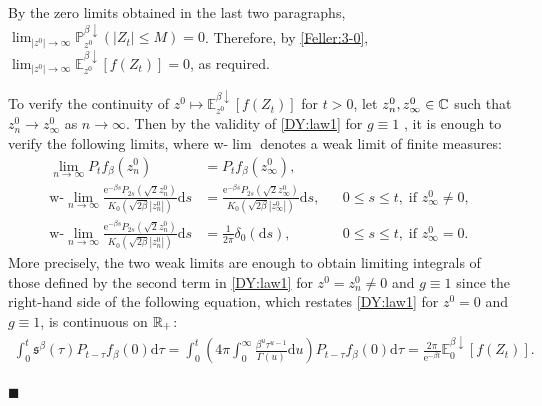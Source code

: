 \documentclass[12pt, twoside]{article}
\numberwithin{figure}{section}
\newcommand{\e}{{\mathrm e}}
\newcommand{\1}{\mathds 1}
\newcommand{\da}{{\downarrow}}
\renewcommand{\P}{{\mathbb P}}
\newcommand{\E}{{\mathbb E}}
\renewcommand{\d}{{\mathrm d}}
\newcommand{\R}{{\Bbb R}}
\newcommand{\2}{{\mathbf 1}}
\newcommand{\s}{{\mathfrak s}}
\renewenvironment{proof}[1][\proofname]{\noindent {\bfseries #1.}\;}{\hfill\ensuremath{\blacksquare}\\}
\newcommand{\two}{{\sqrt{2}}}
\begin{document}
\begin{proof}[Proof of Theorem~\ref{thm:formulas}]
By the zero limits obtained in the last two paragraphs, $\lim_{|z^0|\to\infty}\P^{\beta\da}_{z^0}(|Z_t|\leq M)=0$. Therefore,  by \eqref{Feller:3-0},
$\lim_{|z^0|\to\infty}\E^{\beta\da }_{z^0}[f(Z_t)]=0$, as required. \smallskip 

 To verify the continuity of $z^0\mapsto \E^{\beta\da}_{z^0}[f(Z_t)]$ for $t>0$, let $z^0_n,z^0_\infty\in \Bbb C$ such that $z^0_n\to z^0_\infty$ as $n\to\infty$. Then
by the validity of  \eqref{DY:law1} for $g\equiv 1$  \cite[Theorem~2.10]{C:BES}, it is enough to verify the following limits, where w-$\lim$ denotes a weak limit of finite measures:
\begin{align}
\lim_{n\to\infty}P_tf_\beta(z^0_n)&=P_tf_\beta(z^0_\infty),\label{DYlaw:lim1}\\
\mbox{w-}\lim_{n\to\infty}\frac{\e^{-\beta s}P_{2s}(\two z^0_n)}{K_0(\sqrt{2\beta}|z^0_n|)}\d s&= \frac{\e^{-\beta s}P_{2s}(\two z^0_\infty)}{K_0(\sqrt{2\beta}|z^0_\infty|)}\d s,&& 0\leq s\leq t,\;\mbox{if }z^0_\infty\neq 0 ,\label{DYlaw:lim2}\\
\mbox{w-}\lim_{n\to\infty}\frac{\e^{-\beta s}P_{2s}(\two z^0_n)}{K_0(\sqrt{2\beta}|z^0_n|)}\d s&=\frac{1}{2\pi}\delta_0(\d s),&& 0\leq s\leq t,\;\mbox{if }z^0_\infty= 0 .\label{DYlaw:lim3}
\end{align}
More precisely, the two weak limits are enough to obtain limiting integrals of those defined by the second term in \eqref{DY:law1} for $z^0=z^0_n\neq 0$ and $g\equiv 1$ since the right-hand side of the following equation, which restates \eqref{DY:law1} for $z^0=0$ and $g\equiv 1$, is continuous on $\R_+$:
\begin{align}\label{continuity_t=0}
\int_0^{t} \s^\beta(\tau)P_{t-\tau}f_{\beta}(0)\d \tau=\int_0^{t} \left(4\pi\int_0^\infty \frac{\beta^u\tau^{u-1}}{\Gamma(u)}\d u \right) P_{t-\tau}f_{\beta}(0)\d \tau=\frac{2\pi}{\e^{-\beta t}}\E^{\beta\da}_0[f(Z_t)].
\end{align}


\end{proof}
\end{document}
